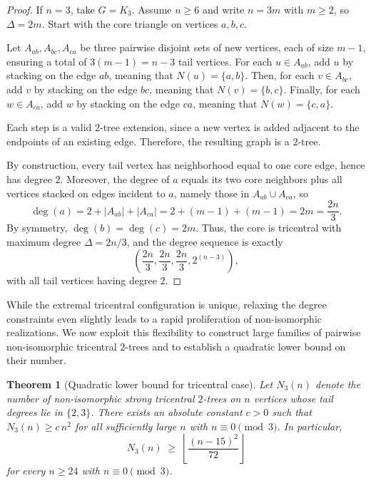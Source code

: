 \documentclass[12pt]{article}
\newtheorem{theorem}{Theorem}[section]
\numberwithin{equation}{section}
\begin{document}
\begin{proof}
If $n=3$, take $G=K_3$.
Assume $n\ge 6$ and write $n=3m$ with $m\ge 2$, so $\Delta=2m$.
Start with the core triangle on vertices $a,b,c$.

Let $A_{ab}, A_{bc}, A_{ca}$ be three pairwise disjoint sets of new vertices, each of size $m-1$, ensuring a total of $3(m-1) = n-3$ tail vertices. For each $u\in A_{ab}$, add $u$ by stacking on the edge $ab$, meaning that $N(u) = \{a,b\}$. Then, for each $v\in A_{bc}$, add $v$ by stacking on the edge $bc$, meaning that $N(v) = \{b,c\}$.
Finally, for each $w\in A_{ca}$, add $w$ by stacking on the edge $ca$, meaning that $N(w) = \{c,a\}$.

Each step is a valid $2$-tree extension, since a new vertex is added adjacent to the endpoints of an existing edge. Therefore, the resulting graph is a $2$-tree.

By construction, every tail vertex has neighborhood equal to one core edge, hence has degree $2$. Moreover, 
the degree of $a$ equals its two core neighbors plus all vertices stacked on edges incident to $a$, namely those in $A_{ab}\cup A_{ca}$, so
\[
\deg(a)=2+|A_{ab}|+|A_{ca}|=2+(m-1)+(m-1)=2m=\frac{2n}{3}.
\]
By symmetry, $\deg(b)=\deg(c)=2m$. Thus, the core is tricentral with maximum degree $\Delta=2n/3$, and the degree sequence is exactly
\[
\left(\frac{2n}{3},\frac{2n}{3},\frac{2n}{3},2^{(n-3)}\right),
\]
with all tail vertices having degree $2$.
\end{proof}

While the extremal tricentral configuration is unique, relaxing the degree constraints even slightly leads to a rapid proliferation of non-isomorphic realizations. We now exploit this flexibility to construct large families of pairwise non-isomorphic tricentral $2$-trees and to establish a quadratic lower bound on their number.

\begin{theorem}[Quadratic lower bound for tricentral case]
\label{thm:quadratic-lower}
Let $N_3(n)$ denote the number of non-isomorphic strong tricentral $2$-trees on $n$ vertices whose tail degrees lie in $\{2,3\}$.
There exists an absolute constant $c>0$ such that $N_3(n)\ge c\,n^2$ for all sufficiently large $n$ with $n\equiv 0\pmod 3$.
In particular,
\[
N_3(n)\;\ge\;\left\lfloor \frac{(n-15)^2}{72}\right\rfloor
\]
for every $n\ge 24$ with $n\equiv 0\pmod 3$.
\end{theorem}
\end{document}

